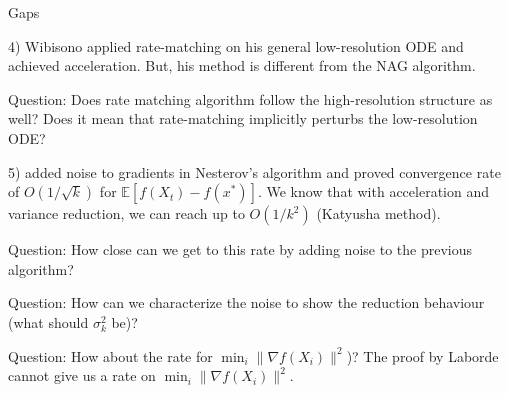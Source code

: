 \documentclass{beamer}
\begin{document}
\begin{frame}[t,allowframebreaks]{Gaps}
\framebreak

4) Wibisono applied rate-matching on his general low-resolution ODE and achieved acceleration. But, his method is different from the NAG algorithm. 

\alert{Question:} Does rate matching algorithm follow the high-resolution structure as well? Does it mean that rate-matching implicitly perturbs the low-resolution ODE? 

\framebreak

5) \cite{pmlr-v108-laborde20a} added noise to gradients in Nesterov's algorithm and proved convergence rate of $O(1/\sqrt{k})$ for $\mathbb E [f(X_t)-f(x^*)]$. We know that with acceleration and variance reduction, we can reach up to $O(1/k^2)$ (Katyusha method). 

\alert{Question:} How close can we get to this rate by adding noise to the previous algorithm?

\alert{Question:} How can we characterize the noise to show the reduction behaviour (what should $\sigma^2_k$ be)?

\alert{Question:} How about the rate for $\min_i \|\nabla f(X_i)\|^2$)? The proof by Laborde cannot give us a rate on $\min_i \|\nabla f(X_i)\|^2$.
\end{frame}






\end{document}
